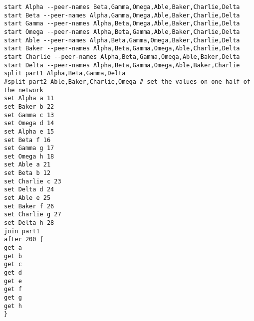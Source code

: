 \documentclass[11pt]{article}
\begin{document}
\begin{lstlisting}[language={}, caption={Partition Merge Test Script}, basicstyle=\ttfamily]
start Alpha --peer-names Beta,Gamma,Omega,Able,Baker,Charlie,Delta 
start Beta --peer-names Alpha,Gamma,Omega,Able,Baker,Charlie,Delta 
start Gamma --peer-names Alpha,Beta,Omega,Able,Baker,Charlie,Delta 
start Omega --peer-names Alpha,Beta,Gamma,Able,Baker,Charlie,Delta 
start Able --peer-names Alpha,Beta,Gamma,Omega,Baker,Charlie,Delta 
start Baker --peer-names Alpha,Beta,Gamma,Omega,Able,Charlie,Delta 
start Charlie --peer-names Alpha,Beta,Gamma,Omega,Able,Baker,Delta 
start Delta --peer-names Alpha,Beta,Gamma,Omega,Able,Baker,Charlie  
split part1 Alpha,Beta,Gamma,Delta
#split part2 Able,Baker,Charlie,Omega # set the values on one half of the network
set Alpha a 11
set Baker b 22
set Gamma c 13
set Omega d 14
set Alpha e 15
set Beta f 16
set Gamma g 17
set Omega h 18
set Able a 21
set Beta b 12
set Charlie c 23
set Delta d 24
set Able e 25
set Baker f 26
set Charlie g 27
set Delta h 28
join part1
after 200 {
get a
get b
get c
get d
get e
get f
get g
get h
}
\end{lstlisting}
\end{document}
